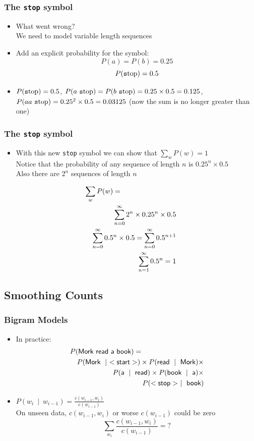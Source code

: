 \documentclass{beamer}
\begin{document}
\begin{frame}
\frametitle{The {\tt stop} symbol}
\begin{itemize}[<+->]
\item What went wrong? \\
We need to model variable length sequences
\item Add an explicit probability for the \lmstop symbol: 
\[ P(a) = P(b) = 0.25  \]
\[ P(\mbox{\texttt stop}) = 0.5 \]
\item $P(\mbox{\texttt stop}) = 0.5$, $P(a\ \mbox{\texttt stop}) = P(b\ \mbox{\texttt stop}) = 0.25 \times 0.5 = 0.125$, 
$P(aa\ \mbox{\texttt stop}) = 0.25^2 \times 0.5 = 0.03125$ (now the sum is no longer greater than one)
\end{itemize}
\end{frame}

\begin{frame}
\frametitle{The {\tt stop} symbol}
\begin{itemize}[<+->]
\item With this new {\tt stop} symbol we can show that $\sum_w P(w) = 1$ \\
Notice that the probability of any sequence of length $n$ is $0.25^n \times 0.5$ \\
Also there are $2^n$ sequences of length $n$
\end{itemize}
\begin{eqnarray}
\lefteqn{\sum_w P(w) = } \nonumber \\
&& \sum_{n=0}^{\infty} 2^n \times 0.25^n \times 0.5 \nonumber \\
&& \sum_{n=0}^{\infty} 0.5^n \times 0.5 = \sum_{n=0}^{\infty} 0.5^{n+1} \nonumber \\
&& \sum_{n=1}^{\infty} 0.5^n = 1 \nonumber
\end{eqnarray}
\end{frame}

\subsection{Smoothing Counts}

\begin{frame}
\frametitle{Bigram Models}
\begin{itemize}[<+->]
\item
In practice: 
\begin{eqnarray*}
\lefteqn{P(\textsf{Mork read a book})=}\\
&& P(\textsf{Mork}~\mid~<\textsf{start}>) \times P(\textsf{read}~\mid~\textsf{Mork}) \times \\
&& P(\textsf{a}~\mid~\textsf{read}) \times P(\textsf{book}~\mid~\textsf{a}) \times \\
&& P(<\textsf{stop}>~\mid~\textsf{book})
\end{eqnarray*}

\item $P(w_i~\mid~w_{i-1}) = \frac{ c(w_{i-1},w_i) } { c(w_{i-1}) }$ \\
 On unseen data, $c(w_{i-1},w_i)$ or worse $c(w_{i-1})$ could be zero
\[ \sum_{w_i} \frac{ c(w_{i-1},w_i) } { c(w_{i-1}) } = ? \]

\end{itemize}
\end{frame}
\end{document}

